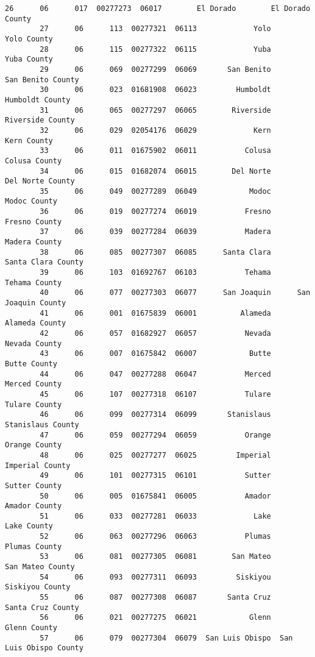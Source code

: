 \documentclass[11pt]{article}
\begin{document}
\begin{Verbatim}[commandchars=\\\{\}]
        26      06      017  00277273  06017        El Dorado        El Dorado County   
        27      06      113  00277321  06113             Yolo             Yolo County   
        28      06      115  00277322  06115             Yuba             Yuba County   
        29      06      069  00277299  06069       San Benito       San Benito County   
        30      06      023  01681908  06023         Humboldt         Humboldt County   
        31      06      065  00277297  06065        Riverside        Riverside County   
        32      06      029  02054176  06029             Kern             Kern County   
        33      06      011  01675902  06011           Colusa           Colusa County   
        34      06      015  01682074  06015        Del Norte        Del Norte County   
        35      06      049  00277289  06049            Modoc            Modoc County   
        36      06      019  00277274  06019           Fresno           Fresno County   
        37      06      039  00277284  06039           Madera           Madera County   
        38      06      085  00277307  06085      Santa Clara      Santa Clara County   
        39      06      103  01692767  06103           Tehama           Tehama County   
        40      06      077  00277303  06077      San Joaquin      San Joaquin County   
        41      06      001  01675839  06001          Alameda          Alameda County   
        42      06      057  01682927  06057           Nevada           Nevada County   
        43      06      007  01675842  06007            Butte            Butte County   
        44      06      047  00277288  06047           Merced           Merced County   
        45      06      107  00277318  06107           Tulare           Tulare County   
        46      06      099  00277314  06099       Stanislaus       Stanislaus County   
        47      06      059  00277294  06059           Orange           Orange County   
        48      06      025  00277277  06025         Imperial         Imperial County   
        49      06      101  00277315  06101           Sutter           Sutter County   
        50      06      005  01675841  06005           Amador           Amador County   
        51      06      033  00277281  06033             Lake             Lake County   
        52      06      063  00277296  06063           Plumas           Plumas County   
        53      06      081  00277305  06081        San Mateo        San Mateo County   
        54      06      093  00277311  06093         Siskiyou         Siskiyou County   
        55      06      087  00277308  06087       Santa Cruz       Santa Cruz County   
        56      06      021  00277275  06021            Glenn            Glenn County   
        57      06      079  00277304  06079  San Luis Obispo  San Luis Obispo County   
        

\end{Verbatim}
\end{document}
